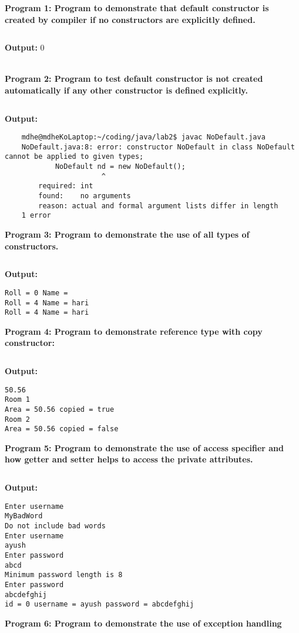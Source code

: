 \documentclass{book}
\begin{document}
\newpage
\par
\textbf{Program 1: Program to demonstrate that default constructor is created by compiler if no constructors are explicitly defined.}
\inputminted{java}{DefaultConstructor.java}
\par
\textbf{Output:}
0
\\
\\
\par
\textbf{Program 2: Program to test default constructor is not  created automatically if any other constructor is defined explicitly.}
\inputminted{java}{NoDefault.java}
\par
\textbf{Output:}
\begin{verbatim}
    mdhe@mdheKoLaptop:~/coding/java/lab2$ javac NoDefault.java
    NoDefault.java:8: error: constructor NoDefault in class NoDefault cannot be applied to given types;
            NoDefault nd = new NoDefault();
                       ^
        required: int
        found:    no arguments
        reason: actual and formal argument lists differ in length
    1 error
\end{verbatim}
\par
\textbf{Program 3: Program to demonstrate the use of all types of constructors.}
\inputminted{java}{AllConstructors.java}
\par
\textbf{Output:}
\begin{verbatim}
Roll = 0 Name =
Roll = 4 Name = hari
Roll = 4 Name = hari 
\end{verbatim}
\par
\textbf{Program 4: Program to demonstrate reference type with copy constructor:}
\inputminted{java}{CopyConstructor.java}
\par
\textbf{Output:}
\begin{verbatim}
50.56
Room 1 
Area = 50.56 copied = true
Room 2
Area = 50.56 copied = false
\end{verbatim}
\par
\textbf{Program 5: Program to demonstrate the use of access specifier and how getter and setter helps to access the private attributes.}
\inputminted{java}{AccessSpecifier.java}
\par
\textbf{Output:}
\begin{verbatim}
Enter username
MyBadWord
Do not include bad words
Enter username
ayush
Enter password
abcd
Minimum password length is 8
Enter password
abcdefghij
id = 0 username = ayush password = abcdefghij
\end{verbatim}
\par
\textbf{Program 6: Program to demonstrate the use of exception handling}
\end{document}
